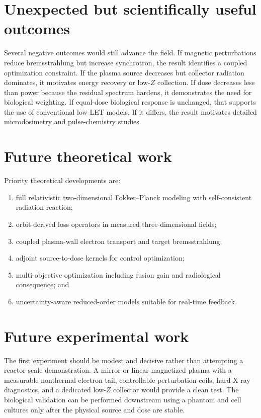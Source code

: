 \section{Unexpected but scientifically useful outcomes}

Several negative outcomes would still advance the field. If magnetic perturbations reduce bremsstrahlung but increase synchrotron, the result identifies a coupled optimization constraint. If the plasma source decreases but collector radiation dominates, it motivates energy recovery or low-$Z$ collection. If dose decreases less than power because the residual spectrum hardens, it demonstrates the need for biological weighting. If equal-dose biological response is unchanged, that supports the use of conventional low-LET models. If it differs, the result motivates detailed microdosimetry and pulse-chemistry studies.

\section{Future theoretical work}

Priority theoretical developments are:
\begin{enumerate}
\item full relativistic two-dimensional Fokker--Planck modeling with self-consistent radiation reaction;
\item orbit-derived loss operators in measured three-dimensional fields;
\item coupled plasma-wall electron transport and target bremsstrahlung;
\item adjoint source-to-dose kernels for control optimization;
\item multi-objective optimization including fusion gain and radiological consequence; and
\item uncertainty-aware reduced-order models suitable for real-time feedback.
\end{enumerate}

\section{Future experimental work}

The first experiment should be modest and decisive rather than attempting a reactor-scale demonstration. A mirror or linear magnetized plasma with a measurable nonthermal electron tail, controllable perturbation coils, hard-X-ray diagnostics, and a dedicated low-$Z$ collector would provide a clean test. The biological validation can be performed downstream using a phantom and cell cultures only after the physical source and dose are stable.


